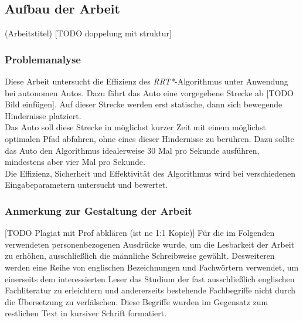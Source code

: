 \subsection{Aufbau der Arbeit}
(Arbeitstitel)
[TODO doppelung mit struktur]  \\ 
\subsubsection{Problemanalyse}
Diese Arbeit untersucht die Effizienz des\textit{ RRT*}-Algorithmus unter Anwendung bei autonomen Autos. Dazu fährt das Auto eine vorgegebene Strecke ab [TODO Bild einfügen]. Auf dieser Strecke werden erst statische, dann sich bewegende Hindernisse platziert. \\
Das Auto soll diese Strecke in möglichst kurzer Zeit mit einem möglichst optimalen Pfad abfahren, ohne eines dieser Hindernisse zu berühren. Dazu sollte das Auto den Algorithmus idealerweise 30 Mal pro Sekunde ausführen, mindestens aber vier Mal pro Sekunde. \\
Die Effizienz, Sicherheit und Effektivität des Algorithmus wird bei verschiedenen Eingabeparametern untersucht und bewertet. \\

\subsubsection{Anmerkung zur Gestaltung der Arbeit}
[TODO Plagiat mit Prof abklären (ist ne 1:1 Kopie)]
Für die im Folgenden verwendeten personenbezogenen
Ausdrücke wurde, um die Lesbarkeit der Arbeit zu erhöhen,
ausschließlich die männliche Schreibweise gewählt. Desweiteren werden eine
Reihe von englischen Bezeichnungen und Fachwörtern verwendet, um einerseits dem
interessierten Leser das Studium der fast ausschließlich englischen
Fachliteratur zu erleichtern und andererseits bestehende Fachbegriffe nicht durch die Übersetzung zu verfälschen. Diese Begriffe
wurden im Gegensatz zum restlichen Text in kursiver Schrift formatiert.

